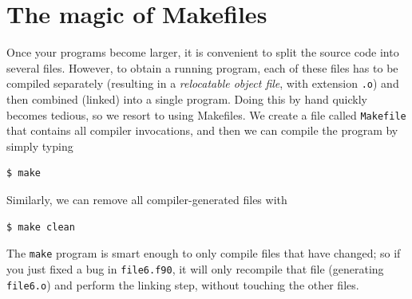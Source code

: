 \documentclass[openany,oneside]{report}
\begin{document}
\chapter{The magic of Makefiles}
\label{chap:Makefiles}

Once your programs become larger, it is convenient to split the source code into several files.
However, to obtain a running program, each of these files has to be compiled separately (resulting in a \emph{relocatable object file}, with extension \texttt{.o}) and then combined (linked) into a single program.
Doing this by hand quickly becomes tedious, so we resort to using Makefiles.
We create a file called \texttt{Makefile} that contains all compiler invocations, and then we can compile the program by simply typing
\begin{verbatim}
$ make
\end{verbatim}
Similarly, we can remove all compiler-generated files with
\begin{verbatim}
$ make clean
\end{verbatim}
The \texttt{make} program is smart enough to only compile files that have changed; so if you just fixed a bug in \texttt{file6.f90}, it will only recompile that file (generating \texttt{file6.o}) and perform the linking step, without touching the other files.
\end{document}
